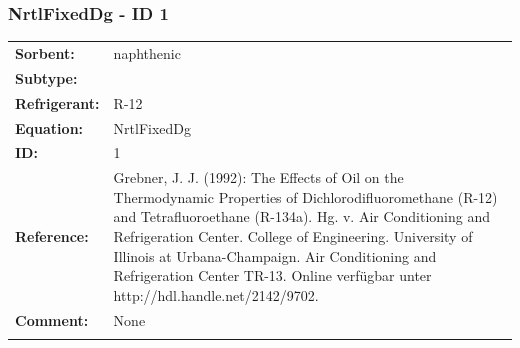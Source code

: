 \subsubsection{NrtlFixedDg - ID 1}
%
\begin{tabular}[l]{|lp{11.5cm}|}
\hline
\addlinespace

\textbf{Sorbent:} & naphthenic \\
\textbf{Subtype:} &  \\
\textbf{Refrigerant:} & R-12 \\
\textbf{Equation:} & NrtlFixedDg \\
\textbf{ID:} & 1 \\
\textbf{Reference:} & Grebner, J. J. (1992): The Effects of Oil on the Thermodynamic Properties of Dichlorodifluoromethane (R-12) and Tetrafluoroethane (R-134a). Hg. v. Air Conditioning and Refrigeration Center. College of Engineering. University of Illinois at Urbana-Champaign. Air Conditioning and Refrigeration Center TR-13. Online verfügbar unter http://hdl.handle.net/2142/9702. \\
\textbf{Comment:} & None \\

\addlinespace
\hline
\end{tabular}
\newline

